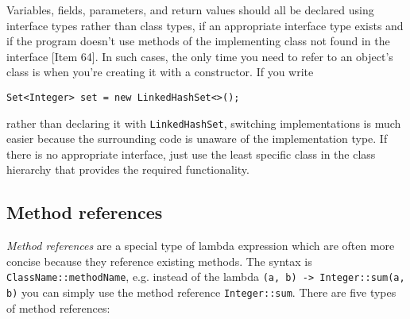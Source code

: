 \documentclass[8pt, table, xcdraw]{article}%
\begin{document}
Variables, fields, parameters, and return values should all be declared using interface types rather than class types, if an appropriate interface type exists and if the program doesn't use methods of the implementing class not found in the interface [Item 64]. In such cases, the only time you need to refer to an object’s class is when you’re creating it with a constructor. If you write

\begin{lstlisting}
Set<Integer> set = new LinkedHashSet<>();
\end{lstlisting}

rather than declaring it with \lstinline{LinkedHashSet}, switching implementations is much easier because the surrounding code is unaware of the implementation type. If there is no appropriate interface, just use the least specific class in the class hierarchy that provides the required functionality.

\subsection{Method references}

\emph{Method references} are a special type of lambda expression which are often more concise because they reference existing methods. The syntax is \lstinline{ClassName::methodName}, e.g. instead of the lambda \lstinline{(a, b) -> Integer::sum(a, b)} you can simply use the method reference \lstinline{Integer::sum}. There are five types of method references:
\end{document}
